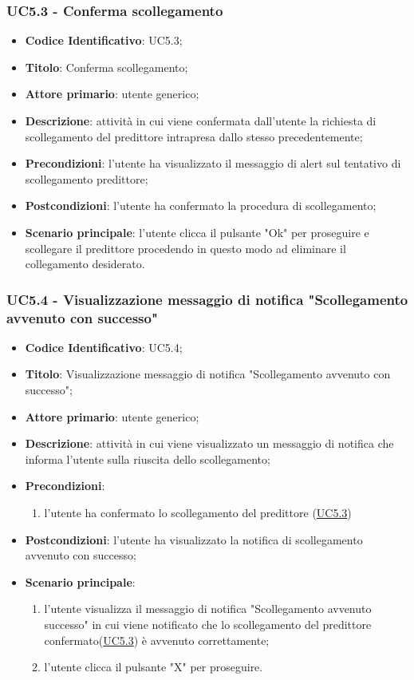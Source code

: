 	\label{par:UC5.3}
	\subsubsection{UC5.3 - Conferma scollegamento}
		\begin{itemize}
			\item\textbf{Codice Identificativo}: UC5.3;
			\item\textbf{Titolo}: Conferma scollegamento;
			\item\textbf{Attore primario}: utente generico;
			\item\textbf{Descrizione}: attività in cui viene confermata dall'utente la richiesta di scollegamento del predittore intrapresa dallo stesso precedentemente;
			\item\textbf{Precondizioni}: l'utente ha visualizzato il messaggio di alert sul tentativo di scollegamento predittore;
			\item\textbf{Postcondizioni}: l'utente ha confermato la procedura di scollegamento;	
			\item\textbf{Scenario principale}: l'utente clicca il pulsante "Ok" per proseguire e scollegare il predittore procedendo in questo modo ad eliminare il collegamento desiderato.
			\end{itemize}
			
	\label{par:UC5.4}
	\subsubsection{UC5.4 - Visualizzazione messaggio di notifica "Scollegamento avvenuto con successo"}
		\begin{itemize}
			\item\textbf{Codice Identificativo}: UC5.4;
			\item\textbf{Titolo}: Visualizzazione messaggio di notifica "Scollegamento avvenuto con successo";
			\item\textbf{Attore primario}: utente generico;
			\item\textbf{Descrizione}: attività in cui viene visualizzato un messaggio di notifica che informa l'utente sulla riuscita dello scollegamento; 
			\item\textbf{Precondizioni}: 
				\begin{enumerate}
					\item l'utente ha confermato lo scollegamento del predittore (\hyperref[par:UC5.3]{UC5.3})
				\end{enumerate}
			\item\textbf{Postcondizioni}: l'utente ha visualizzato la notifica di scollegamento avvenuto con successo;				
			\item\textbf{Scenario principale}:
				\begin{enumerate}
					\item l'utente visualizza il messaggio di notifica "Scollegamento avvenuto successo" in cui viene notificato che lo scollegamento del predittore confermato(\hyperref[par:UC5.3]{UC5.3}) è avvenuto correttamente;
					\item l'utente clicca il pulsante "X" per proseguire.		
				\end{enumerate}		
		\end{itemize}

